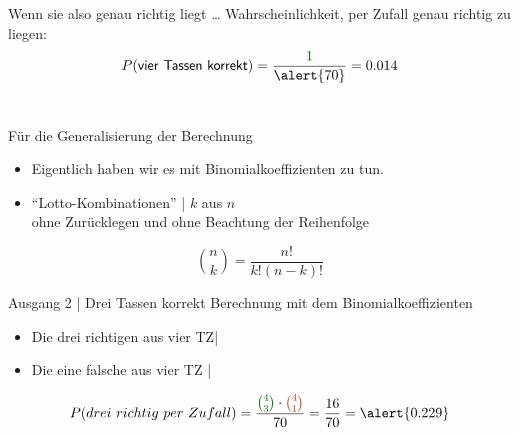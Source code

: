 \begin{frame}
  {Wenn sie also genau richtig liegt \ldots}
  Wahrscheinlichkeit, per Zufall genau richtig zu liegen:\\
  \Viertelzeile
  \begin{equation}
    P(\mathsf{vier\ Tassen\ korrekt})=\frac{\gruen{1}}{\alert{70}}=0.014
  \end{equation}\\
  \Zeile
  \centering 
\end{frame}

\begin{frame}
  {Für die Generalisierung der Berechnung}
  \begin{itemize}[<+->]
    \item Eigentlich haben wir es mit \alert{Binomialkoeffizienten} zu tun.
      \Halbzeile
    \item "`Lotto-Kombinationen"' | $k$ aus $n$\\
      \alert{ohne Zurücklegen und ohne Beachtung der Reihenfolge}
  \end{itemize}
  \Zeile
  \pause
  \begin{equation}
    \binom{n}{k}=\frac{n!}{k!(n-k)!}
  \end{equation}
\end{frame}

\begin{frame}
  {Ausgang 2 | Drei Tassen korrekt}
  Berechnung mit dem Binomialkoeffizienten
  \Halbzeile
  \begin{itemize}[<+->]
    \item Die drei richtigen aus vier TZ| 
    \item Die eine falsche aus vier TZ | 
  \end{itemize}
  \Zeile
  \pause
  \begin{equation}
    P(drei\ richtig\ per\ Zufall)=\frac{\gruen{\binom{4}{3}}\cdot\rot{\binom{4}{1}}}{70}=\frac{16}{70}=\alert{0.229}
  \end{equation}\\
  \Zeile
  \centering 
\end{frame}

